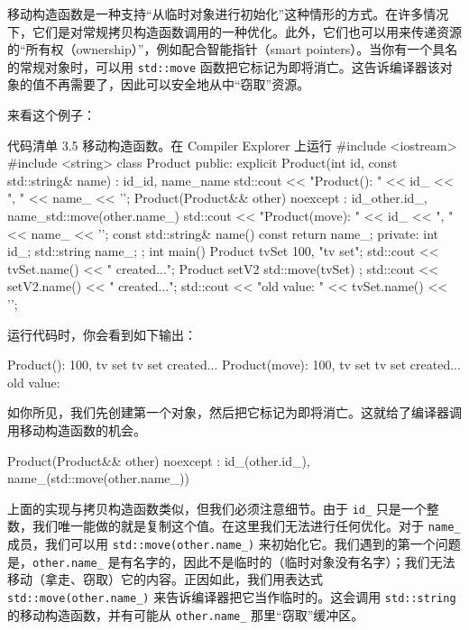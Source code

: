 
移动构造函数是一种支持“从临时对象进行初始化”这种情形的方式。在许多情况下，它们是对常规拷贝构造函数调用的一种优化。此外，它们也可以用来传递资源的“所有权（ownership）”，例如配合智能指针（smart pointers）。当你有一个具名的常规对象时，可以用 \texttt{std::move} 函数把它标记为即将消亡。这告诉编译器该对象的值不再需要了，因此可以安全地从中“窃取”资源。

来看这个例子：


\begin{codeboxt}[cpp]{代码清单 3.5 移动构造函数。在 Compiler Explorer 上运行}
#include <iostream>
#include <string>
class Product {
public:
explicit Product(int id, const std::string& name)
: id_{id}, name_{name} {
std::cout << "Product(): " << id_ << ", " << name_ << '\n';
}
Product(Product&& other) noexcept
: id_{other.id_}, name_{std::move(other.name_)} {
std::cout << "Product(move): " << id_ << ", " << name_ << '\n';
}
const std::string& name() const { return name_; }
private:
int id_;
std::string name_;
};
int main() {
Product tvSet {100, "tv set"};
std::cout << tvSet.name() << " created...\n";
Product setV2 { std::move(tvSet) };
std::cout << setV2.name() << " created...\n";
std::cout << "old value: " << tvSet.name() << '\n';
}
\end{codeboxt}

运行代码时，你会看到如下输出：

\begin{codebox}[cpp]
Product(): 100, tv set
tv set created...
Product(move): 100, tv set
tv set created...
old value:
\end{codebox}

如你所见，我们先创建第一个对象，然后把它标记为即将消亡。这就给了编译器调用移动构造函数的机会。

\begin{codebox}[cpp]
Product(Product&& other) noexcept
: id_(other.id_), name_(std::move(other.name_))
\end{codebox}

上面的实现与拷贝构造函数类似，但我们必须注意细节。由于 \texttt{id\_} 只是一个整数，我们唯一能做的就是复制这个值。在这里我们无法进行任何优化。对于 \texttt{name\_} 成员，我们可以用 \texttt{std::move(other.name\_)} 来初始化它。我们遇到的第一个问题是，\texttt{other.name\_} 是有名字的，因此不是临时的（临时对象没有名字）；我们无法移动（拿走、窃取）它的内容。正因如此，我们用表达式 \texttt{std::move(other.name\_)} 来告诉编译器把它当作临时的。这会调用 \texttt{std::string} 的移动构造函数，并有可能从 \texttt{other.name\_} 那里“窃取”缓冲区。

